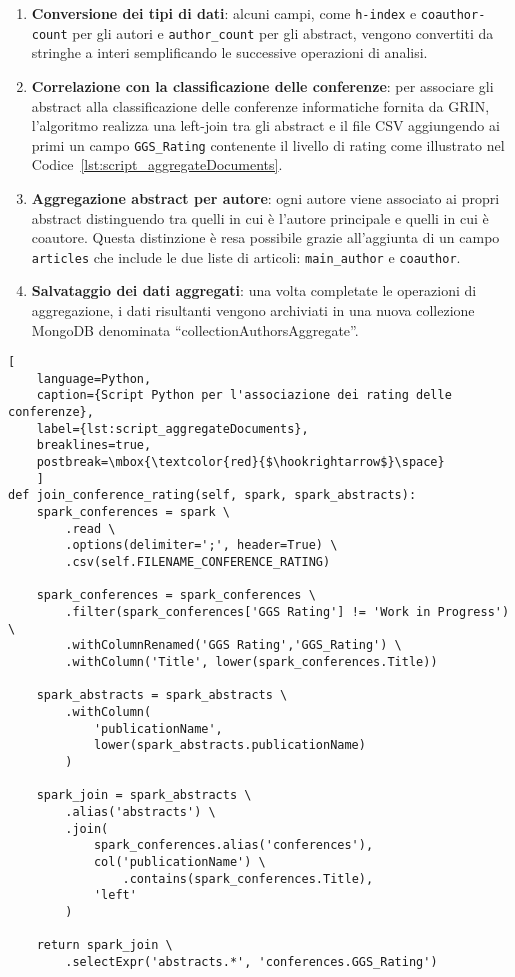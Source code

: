 \begin{enumerate}
  \item \textbf{Conversione dei tipi di dati}: alcuni campi, come \texttt{h-index} e \texttt{coauthor-count} per gli autori e \texttt{author\_count} per gli abstract, vengono convertiti da stringhe a interi semplificando le successive operazioni di analisi.
  
  \item \textbf{Correlazione con la classificazione delle conferenze}: per associare gli abstract alla classificazione delle conferenze informatiche fornita da GRIN, l'algoritmo realizza una left-join tra gli abstract e il file CSV aggiungendo ai primi un campo \texttt{GGS\_Rating} contenente il livello di rating come illustrato nel Codice~\ref{lst:script_aggregateDocuments}.
  
  \item \textbf{Aggregazione abstract per autore}: ogni autore viene associato ai propri abstract distinguendo tra quelli in cui è l'autore principale e quelli in cui è coautore. Questa distinzione è resa possibile grazie all'aggiunta di un campo \texttt{articles} che include le due liste di articoli: \texttt{main\_author} e \texttt{coauthor}.
  
  \item \textbf{Salvataggio dei dati aggregati}: una volta completate le operazioni di aggregazione, i dati risultanti vengono archiviati in una nuova collezione MongoDB denominata ``collectionAuthorsAggregate''.
\end{enumerate}

\begin{lstfloat}
    \begin{lstlisting}[
    language=Python,
    caption={Script Python per l'associazione dei rating delle conferenze},
    label={lst:script_aggregateDocuments},
    breaklines=true,
    postbreak=\mbox{\textcolor{red}{$\hookrightarrow$}\space}
    ]
def join_conference_rating(self, spark, spark_abstracts):
    spark_conferences = spark \
        .read \
        .options(delimiter=';', header=True) \
        .csv(self.FILENAME_CONFERENCE_RATING)
    
    spark_conferences = spark_conferences \
        .filter(spark_conferences['GGS Rating'] != 'Work in Progress') \
        .withColumnRenamed('GGS Rating','GGS_Rating') \
        .withColumn('Title', lower(spark_conferences.Title))

    spark_abstracts = spark_abstracts \
        .withColumn(
            'publicationName',
            lower(spark_abstracts.publicationName)
        )

    spark_join = spark_abstracts \
        .alias('abstracts') \
        .join(
            spark_conferences.alias('conferences'),
            col('publicationName') \
                .contains(spark_conferences.Title),
            'left'
        )
    
    return spark_join \
        .selectExpr('abstracts.*', 'conferences.GGS_Rating')
    \end{lstlisting}
\end{lstfloat}
